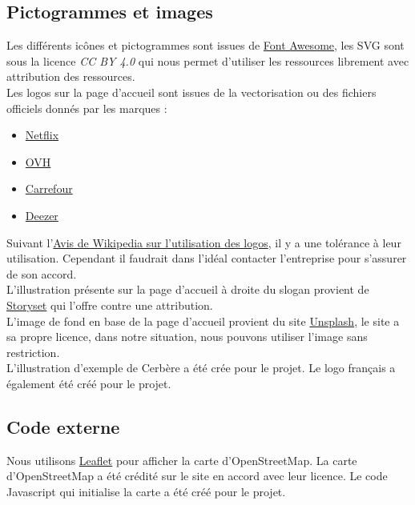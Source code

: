 \documentclass{article}
\begin{document}
\subsection{Pictogrammes et images}
Les différents icônes et pictogrammes sont issues de \href{https://fontawesome.com}{Font Awesome}, les SVG sont sous la licence \textit{CC BY 4.0} qui nous permet d'utiliser les ressources librement avec attribution des ressources.
\\

Les logos sur la page d'accueil sont issues de la vectorisation ou des fichiers officiels donnés par les marques :
\begin{itemize}
    \item \href{https://brand.netflix.com/#/assets/logos}{Netflix}
    \item \href{https://corporate.ovhcloud.com/en/newsroom/assets/}{OVH}
    \item \href{https://brandcenter.carrefour.com/public/les_regles_dusage_du_logotype.html}{Carrefour}
    \item \href{https://deezerbrand.com/d/9wmMErzrRuiH/brand-elements}{Deezer}
\end{itemize}

Suivant l'\href{https://fr.wikipedia.org/wiki/Wikip%C3%A9dia:Autorisation_d%27utilisation_d%27image/Logo}{Avis de Wikipedia sur l'utilisation des logos}, il y a une tolérance à leur utilisation. Cependant il faudrait dans l'idéal contacter l'entreprise pour s'assurer de son accord.
\\

L'illustration présente sur la page d'accueil à droite du slogan provient de \href{https://storyset.com}{Storyset} qui l'offre contre une attribution.
\\

L'image de fond en base de la page d'accueil provient du site \href{https://unsplash.com/photos/hxi_yRxODNc}{Unsplash}, le site a sa propre licence, dans notre situation, nous pouvons utiliser l'image sans restriction.
\\

L'illustration d'exemple de Cerbère a été crée pour le projet. Le logo français a également été créé pour le projet.

\subsection{Code externe}
Nous utilisons \href{https://leafletjs.com}{Leaflet} pour afficher la carte d'OpenStreetMap. La carte d'OpenStreetMap a été crédité sur le site en accord avec leur licence. Le code Javascript qui initialise la carte a été créé pour le projet.
\end{document}
